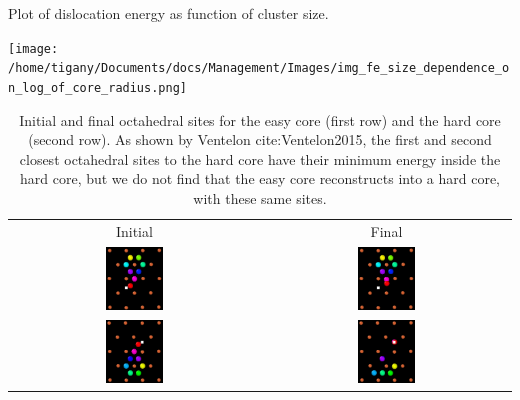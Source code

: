 \documentclass[a4paper]{apa6}
\begin{document}
Plot of dislocation energy as function of cluster size. 
\begin{center}
\texttt{[image: /home/tigany/Documents/docs/Management/Images/img\_fe\_size\_dependence\_on\_log\_of\_core\_radius.png]}
\end{center}



     \begin{table}	
    \begin{tabular}{cc}
        \small  Initial  & Final \\ 
	     \includegraphics[width=0.24\textwidth]{../Images/easy_core_initial_all_fe_octahedral_sites_with_core.png} &
	           \includegraphics[width=0.24\textwidth]{../Images/easy_core_final_all_fe_octahedral_sites_with_core.png}  \\
	     \includegraphics[width=0.24\textwidth]{../Images/hard_core_initial_all_fe_octahedral_sites_with_core.png} &
	           \includegraphics[width=0.24\textwidth]{../Images/hard_core_final_all_fe_octahedral_sites_with_core.png}  \\
		   
    	      \end{tabular}		
\caption{ Initial and final octahedral sites for the easy core (first row) and the hard core (second row). As shown by Ventelon cite:Ventelon2015, the first and second closest octahedral sites to the hard core have their minimum energy inside the hard core, but we do not find that the easy core reconstructs into a hard core, with these same sites. }
    \end{table}
\end{document}
